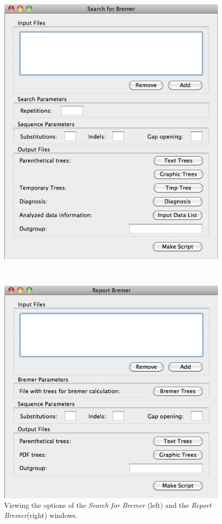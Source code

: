 {\begin{figure}
\centering
\begin{minipage}[c]{0.45\textwidth}
\includegraphics[width=\textwidth]{doc/figures/searchforbremer_window.jpg}
\end{minipage}
\,
\begin{minipage}[c]{0.52\textwidth}
\includegraphics[width=\textwidth]{doc/figures/reportbremer_window.jpg}
\end{minipage}
\caption{Viewing the options of the \emph{Search for Bremer} (left) and the 
\emph{Report Bremer}(right) windows.}
\label{fig:search_report_bremer}
\end{figure}

}
